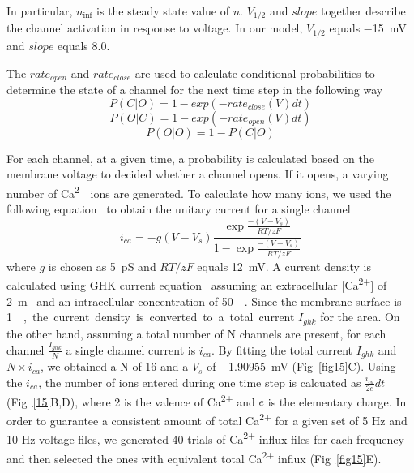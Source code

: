 \documentclass[10pt,letterpaper]{article}
\begin{document}
In particular, $n_{\inf}$ is the steady state value of $n$. $V_{1/2}$ and $slope$ together describe the channel activation in response to voltage. In our model, $V_{1/2}$ equals \SI{-15}{\mV} and $slope$ equals 8.0.

The $rate_{open}$ and $rate_{close}$ are used to calculate conditional probabilities to determine the state of a channel for the next time step in the following way
\begin{equation}P(C|O)=1-exp(-rate_{close}(V)dt)\end{equation}
\begin{equation}P(O|C)=1-exp(-rate_{open}(V)dt)\end{equation}
\begin{equation}P(O|O)=1-P(C|O)\end{equation}

For each channel, at a given time, a probability is calculated based on the membrane voltage to decided whether a channel opens. If it opens, a varying number of Ca\textsuperscript{2+} ions are generated. To calculate how many ions, we used the following equation~\cite{2013PNAS..11015794T} to obtain the unitary current for a single channel
\begin{equation}i_{ca}=-g(V-V_s)\frac{\exp\frac{-(V-V_s)}{RT/zF}}{1-\exp\frac{-(V-V_s)}{RT/zF}}\end{equation}
where $g$ is chosen as \SI{5}{\pico\siemens} and $RT/zF$ equals \SI{12}{\milli\volt}. A current density is calculated using GHK current equation~\cite{citeulike:306134} assuming an extracellular [Ca\textsuperscript{2+}] of \SI{2}{\m\Molar} and an intracellular concentration of \SI{50}{\nano\Molar}. Since the membrane surface is \SI{1}{\um\square}, the current density is converted to a total current $I_{ghk}$ for the area. On the other hand, assuming a total number of N channels are present, for each channel $\frac{I_{ghk}}{N}$ a single channel current is $i_{ca}$. By fitting the total current $I_{ghk}$ and $N\times i_{ca}$, we obtained a N of 16 and a $V_s$ of \SI{-1.90955}{\milli\volt} (Fig~\ref{fig15}C). Using the $i_{ca}$, the number of ions entered during one time step is calcuated as $\frac{i_{ca}}{2e}dt$ (Fig~\ref{15}B,D), where 2 is the valence of Ca\textsuperscript{2+} and $e$ is the elementary charge. In order to guarantee a consistent amount of total Ca\textsuperscript{2+} for a given set of 5 Hz and 10 Hz voltage files, we generated 40 trials of Ca\textsuperscript{2+} influx files for each frequency and then selected the ones with equivalent total Ca\textsuperscript{2+} influx (Fig~\ref{fig15}E).
\end{document}
